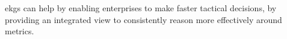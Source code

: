 %
%
\Glspl{ekg} can help by enabling enterprises to make faster tactical decisions, by providing an integrated view to
consistently reason more effectively around metrics.
